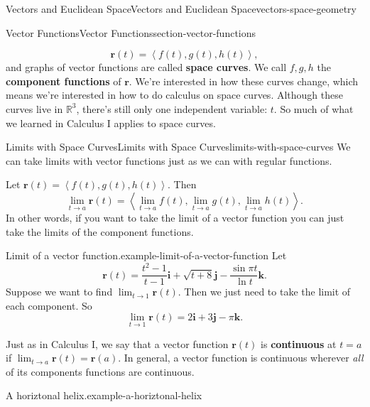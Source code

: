 \documentclass[oneside,10pt,]{book}
\newcommand{\terminology}[1]{\textbf{#1}}
\numberwithin{equation}{section}
\newcommand{\RR}{\mathbb{R}}
\newcommand{\vv}[1]{\mathbf{#1}}
\newcommand{\dotprod}[1]{\left\langle #1 \right\rangle}
\begin{document}
\begin{chapterptx}{Vectors and Euclidean Space}{}{Vectors and Euclidean Space}{}{}{vectors-space-geometry}
\begin{sectionptx}{Vector Functions}{}{Vector Functions}{}{}{section-vector-functions}
\begin{introduction}{}
\begin{equation*}
\vv{r}(t) = \dotprod{f(t),g(t),h(t)},
\end{equation*}
and graphs of vector functions are called \terminology{space curves}. We call \(f,g,h\) the \terminology{component functions} of \(\vv{r}\). We're interested in how these curves change, which means we're interested in how to do calculus on space curves. Although these curves live in \(\RR^{3}\), there's still only one independent variable: \(t\). So much of what we learned in Calculus I applies to space curves.%
\end{introduction}%
%
%
\typeout{************************************************}
\typeout{************************************************}
%
\begin{subsectionptx}{Limits with Space Curves}{}{Limits with Space Curves}{}{}{limits-with-space-curves}
\hypertarget{p-1251}{}%
We can take limits with vector functions just as we can with regular functions.%
\par
\hypertarget{p-1252}{}%
Let \(\vv{r}(t) = \dotprod{f(t),g(t),h(t)}\). Then%
%
\begin{equation}
\lim_{t\to a}\vv{r}(t) = \dotprod{\lim_{t\to a}f(t),\lim_{t\to a}g(t),\lim_{t\to a}h(t)}.\label{limits-vector-functions}
\end{equation}
\hypertarget{p-1253}{}%
In other words, if you want to take the limit of a vector function you can just take the limits of the component functions.%
\begin{example}{Limit of a vector function.}{example-limit-of-a-vector-function}%
\hypertarget{p-1254}{}%
Let%
%
\begin{equation*}
\vv{r}(t) = \frac{t^{2}-1}{t-1}\vv{i} + \sqrt{t+8}\vv{j} - \frac{\sin\pi t}{\ln t}\vv{k}.
\end{equation*}
\hypertarget{p-1255}{}%
Suppose we want to find \(\lim_{t\to 1}\vv{r}(t)\). Then we just need to take the limit of each component. So%
%
\begin{equation*}
\lim_{t\to1}\vv{r}(t) = 2\vv{i}+3\vv{j} -\pi\vv{k}.
\end{equation*}
\end{example}
\hypertarget{p-1256}{}%
Just as in Calculus I, we say that a vector function \(\vv{r}(t)\) is \terminology{continuous} at \(t=a\) if \(\lim_{t\to a}\vv{r}(t) = \vv{r}(a)\). In general, a vector function is continuous wherever \emph{all} of its components functions are continuous.%
\begin{example}{A horiztonal helix.}{example-a-horiztonal-helix}%

\end{example}
\end{subsectionptx}
\end{sectionptx}
\end{chapterptx}
\end{document}

